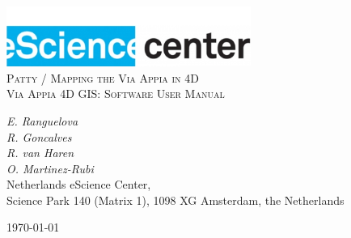\documentclass[a4paper,11pt]{article}
\begin{document}
\begin{titlepage}
\begin{center}
\includegraphics[width=0.6\textwidth]{fig/logo}\\[3cm]    
\textsc{\LARGE Patty / Mapping the Via Appia in 4D}\\[0.5cm]
\textsc{\large Via Appia 4D GIS: Software User Manual}\\[0.5cm]
\vfill
\end{center}
{\large
\emph{E. Ranguelova} \\
\emph{R. Goncalves } \\
\emph{R. van Haren } \\
\emph{O. Martinez-Rubi } \\
}
{\large
{Netherlands eScience Center, \\
Science Park 140 (Matrix 1), 1098 XG Amsterdam, the Netherlands\\
}
}
\begin{center}
{\large \today}
\end{center}
\end{titlepage}

\tableofcontents

\newpage











\end{document}
